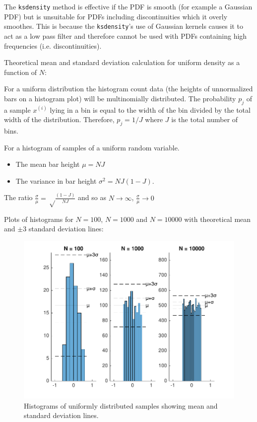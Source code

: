 \documentclass[12pt]{article}
\newcommand{\code}[1]{\texttt{#1}}
\begin{document}
\begin{enumerate}
The \code{ksdensity} method is effective if the PDF is smooth (for example a Gaussian PDF) but is unsuitable for PDFs including discontinuities which it overly smoothes. This is because the \code{ksdensity}'s use of Gaussian kernels causes it to act as a low pass filter and therefore cannot be used with PDFs containing high frequencies (i.e. discontinuities).



Theoretical mean and standard deviation calculation for uniform density as a function of $N$:

For a uniform distribution the histogram count data (the heights of unnormalized bars on a histogram plot) will be multinomially distributed. The probability $p_j$ of a sample  $x^{(i)}$ lying in a bin is equal to the width of the bin divided by the total width of the distribution. Therefore, $p_j = 1/J$ where $J$ is the total number of bins.

For a histogram of samples of a uniform random variable.

\begin{itemize}
\item The mean bar height  $\mu = NJ$
\item The variance in bar height $\sigma^2 = NJ(1-J)$.
\end{itemize}


The ratio $\frac \sigma \mu = \sqrt \frac{(1-J)}{NJ}$ and so as $N \to \infty$, $\frac \sigma \mu \to 0$


Plots of histograms for $N=100$,  $N=1000$ and $N=10000$ with theoretical mean  and $\pm 3$ standard deviation lines:


\begin{figure}[H]
\includegraphics[width=\textwidth]{figures/uniform-bar-distribution.pdf}
  \caption{Histograms of uniformly distributed samples showing mean and standard deviation lines.}
  \label{fig:hist-dist}
\end{figure}



\end{enumerate}
\end{document}
